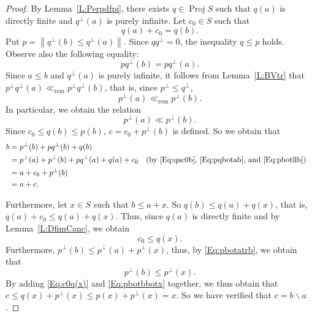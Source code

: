 \documentclass[psamsfonts,reqno]{memo-l}
\theoremstyle{plain}
\theoremstyle{definition}
\theoremstyle{remark}
\numberwithin{equation}{section}
\newcommand{\rem}{\ll_{\mathrm{rem}}}
\newcommand{\sd}{\smallsetminus}
\newcommand{\bv}[1]{\left\|#1\right\|}
\DeclareMathOperator{\BB}{Proj}
\begin{document}
\begin{proof}
By Lemma~\ref{L:Perpdfpi}, there exists $q\in\BB{S}$\index{pzzroj@$\BB{S}$}
such that $q(a)$ is directly finite and $q^\bot(a)$
is purely infinite. Let
$c_0\in S$ such that
\begin{equation}\label{Eq:qac0b}
   q(a)+c_0=q(b).
   \end{equation}
Put $p=\bv{q^\bot(b)\leq q^\bot(a)}$. Since $qq^\bot=0$, the inequality
$q\leq p$ holds. Observe also the following equality:
   \begin{equation}\label{Eq:pqbotab}
   pq^\bot(b)=pq^\bot(a).
   \end{equation}
Since $a\leq b$ and $q^\bot(a)$ is
purely infinite, it follows from Lemma~\ref{L:BVtr} that
$p^\bot q^\bot(a)\rem p^\bot q^\bot(b)$, that is, since $p^\bot\leq q^\bot$,
   \begin{equation}\label{Eq:pbotatrb}
   p^\bot(a)\rem p^\bot(b).
   \end{equation}
In particular, we obtain the relation
   \begin{equation}\label{Eq:pbotllb}
   p^\bot(a)\ll p^\bot(b).
   \end{equation}
Since $c_0\leq q(b)\leq p(b)$, $c=c_0+p^\bot(b)$ is defined.
So we obtain that
   \begin{align*}
   b&=p^\bot(b)+pq^\bot(b)+q(b)\\
   &=p^\bot(a)+p^\bot(b)+pq^\bot(a)+q(a)+c_0
   &&\text{(by \eqref{Eq:qac0b}, \eqref{Eq:pqbotab}, and \eqref{Eq:pbotllb})}\\
   &=a+c_0+p^\bot(b)\\
   &=a+c.
   \end{align*}

Furthermore, let $x\in S$ such that $b\leq a+x$. So $q(b)\leq q(a)+q(x)$,
that is, $q(a)+c_0\leq q(a)+q(x)$. Thus, since $q(a)$
is directly finite and by Lemma~\ref{L:DfimCanc}, we
obtain
   \begin{equation}\label{Eq:c0q(x)}
   c_0\leq q(x).
   \end{equation}
Furthermore, $p^\bot(b)\leq p^\bot(a)+p^\bot(x)$, thus, by
\eqref{Eq:pbotatrb}, we obtain that
   \begin{equation}\label{Eq:pbotbbotx}
   p^\bot(b)\leq p^\bot(x).
   \end{equation}
By adding \eqref{Eq:c0q(x)} and \eqref{Eq:pbotbbotx} together, we thus
obtain that $c\leq q(x)+p^\bot(x)\leq p(x)+p^\bot(x)=x$. So we have verified
that $c=b\sd a$.
\end{proof}
\end{document}
